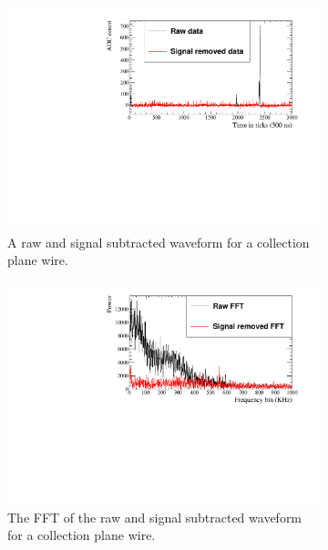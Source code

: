 \begin{figure}
  \centering
  \begin{subfigure}{0.48\textwidth}
    \centering
    \includegraphics[width=\textwidth]{Waveforms}
    \caption{A raw and signal subtracted waveform for a collection plane wire.}
    \label{fig:FreqWaveform}
  \end{subfigure}%
  \hspace{0.03\textwidth}%
  \begin{subfigure}{0.48\textwidth}
    \centering
    \includegraphics[width=\textwidth]{NoiseFFTs}
    \caption{The FFT of the raw and signal subtracted waveform for a collection plane wire.}
    \label{fig:FreqFFT}
  \end{subfigure}
  \begin{subfigure}{0.48\textwidth}

\end{subfigure}
\end{figure}
